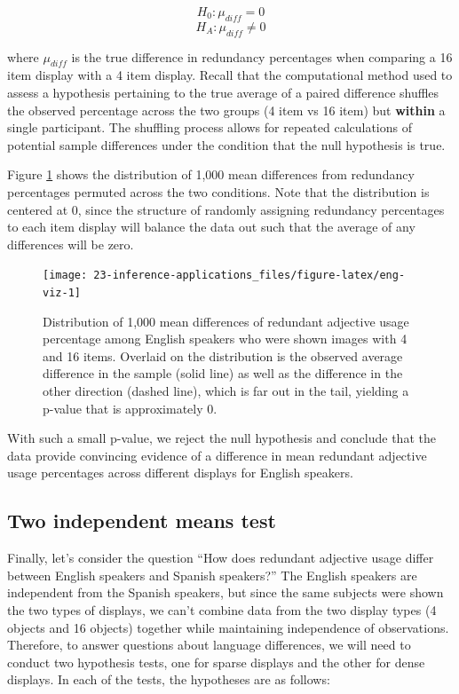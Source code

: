 \documentclass[
  10pt,
  openany]{book}
\begin{document}
\[H_0: \mu_{diff} = 0\]
\[H_A: \mu_{diff} \ne 0\]

where \(\mu_{diff}\) is the true difference in redundancy percentages when comparing a 16 item display with a 4 item display.
Recall that the computational method used to assess a hypothesis pertaining to the true average of a paired difference shuffles the observed percentage across the two groups (4 item vs 16 item) but \textbf{within} a single participant.
The shuffling process allows for repeated calculations of potential sample differences under the condition that the null hypothesis is true.

Figure \ref{fig:eng-viz} shows the distribution of 1,000 mean differences from redundancy percentages permuted across the two conditions.
Note that the distribution is centered at 0, since the structure of randomly assigning redundancy percentages to each item display will balance the data out such that the average of any differences will be zero.

\begin{figure}[h]

{\centering \texttt{[image: 23-inference-applications\_files/figure-latex/eng-viz-1]} 

}

\caption{Distribution of 1,000 mean differences of redundant adjective usage percentage among English speakers who were shown images with 4 and 16 items. Overlaid on the distribution is the observed average difference in the sample (solid line) as well as the difference in the other direction (dashed line), which is far out in the tail, yielding a p-value that is approximately 0.}\label{fig:eng-viz}
\end{figure}

With such a small p-value, we reject the null hypothesis and conclude that the data provide convincing evidence of a difference in mean redundant adjective usage percentages across different displays for English speakers.

\hypertarget{two-independent-means-test}{%
\subsection{Two independent means test}\label{two-independent-means-test}}

Finally, let's consider the question ``How does redundant adjective usage differ between English speakers and Spanish speakers?'' The English speakers are independent from the Spanish speakers, but since the same subjects were shown the two types of displays, we can't combine data from the two display types (4 objects and 16 objects) together while maintaining independence of observations.
Therefore, to answer questions about language differences, we will need to conduct two hypothesis tests, one for sparse displays and the other for dense displays.
In each of the tests, the hypotheses are as follows:
\end{document}
